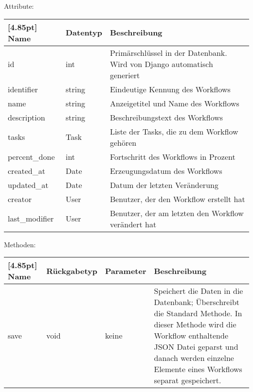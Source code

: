             Attribute:
            \begin{center}
            	\renewcommand{\arraystretch}{1.5}
	            \setlength\tabcolsep{5pt}
            	\begin{tabularx}{\textwidth}{|l|l|X|}
            		\hline
                    \rowcolor[gray]{0.75}[4.85pt]            		
            	    Name & Datentyp & Beschreibung \\ \hline
            		id & int & Primärschlüssel in der Datenbank. Wird von Django automatisch generiert \\ \hline
					identifier & string & Eindeutige Kennung des Workflows\\ \hline
					name & string & Anzeigetitel und Name des Workflows\\ \hline
					description & string & Beschreibungstext des Workflows\\ \hline				tasks & Task & Liste der Tasks, die zu dem Workflow gehören\\ \hline
					percent\_done & int & Fortschritt des Workflows in Prozent\\ \hline
					created\_at & Date & Erzeugungsdatum des Workflows \\ \hline
					updated\_at & Date & Datum der letzten Veränderung \\ \hline 
					creator & User & Benutzer, der den Workflow erstellt hat\\ \hline
					last\_modifier & User & Benutzer, der am letzten den Workflow verändert hat\\ \hline
					\hline
            	\end{tabularx}
            \end{center}

        
             Methoden:
	        \begin{center}
	        	\setlength\tabcolsep{5pt}
	        	\renewcommand{\arraystretch}{1.5}
	        	
	        	\begin{tabularx}{\textwidth}{|l|l|l|X|}
	        		\hline
	        		\rowcolor[gray]{0.75}[4.85pt]
	        		Name & Rückgabetyp & Parameter & Beschreibung \\ \hline 
	        		save & void & keine & Speichert die Daten in die Datenbank; Überschreibt die Standard Methode. In dieser Methode wird die Workflow enthaltende JSON Datei geparst und danach werden einzelne Elemente eines Workflows separat gespeichert. \\ 
	        		\hline
	        	\end{tabularx}
	        \end{center}
